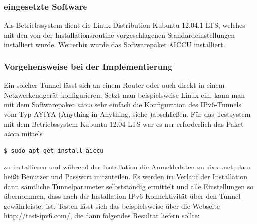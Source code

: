 \documentclass[a4paper,12pt]{scrartcl}
\begin{document}
\subsubsection{eingesetzte Software}
Als Betriebssystem dient die Linux-Distribution Kubuntu 12.04.1 LTS, welches mit den von der Installationsroutine vorgeschlagenen Standardeinstellungen installiert wurde. Weiterhin wurde das Softwarepaket AICCU installiert. 

\subsubsection{Vorgehensweise bei der Implementierung}

Ein solcher Tunnel l\"asst sich an einem Router oder auch direkt in einem Netzwerkendger\"at konfigurieren. Setzt man beispielsweise Linux ein, kann man mit dem Softwarepaket \textit{aiccu} sehr einfach die Konfiguration des IPv6-Tunnels vom Typ AYIYA (Anything in Anything, siehe\cite[sixxsayiya]{sixxsayiya} )abschlie{\ss}en. F\"ur das Testsystem mit dem Betriebssystem Kubuntu 12.04 LTS war es nur erforderlich das Paket \textit{aiccu} mittels 

\begin{lstlisting}
$ sudo apt-get install aiccu
\end{lstlisting}

zu installieren und w\"ahrend der Installation die Anmeldedaten zu sixxs.net, dass hei{\ss}t Benutzer und Passwort mitzuteilen. Es werden im Verlauf der Installation dann s\"amtliche Tunnelparameter selbstst\"andig ermittelt und alle Einstellungen so \"ubernommen, dass nach der Installation IPv6-Konnektivität \"uber den Tunnel gew\"ahrleistet ist. Testen l\"asst sich das beispielsweise \"uber die Webseite \url{http://test-ipv6.com/}, die dann folgendes Resultat liefern sollte:
\end{document}
